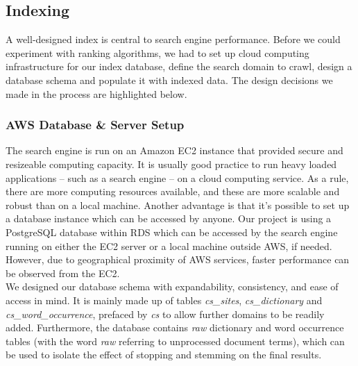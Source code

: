 
\subsection{Indexing} %
\label{sub:methods}
A well-designed index is central to search engine performance. Before we could experiment with ranking algorithms, we had to set up cloud computing infrastructure for our index database, define the search domain to crawl, design a database schema and populate it with indexed data. The design decisions we made in the process are highlighted below. %

\subsubsection{AWS Database \& Server Setup} %
\label{ssub:database_and_server_setup}

The search engine is run on an Amazon EC2 instance that provided secure and resizeable computing capacity. It is usually good practice to run heavy loaded applications -- such as a search engine -- on a cloud computing service. As a rule, there are more computing resources available, and these are more scalable and robust than on a local machine. Another advantage is that it's possible to set up a database instance which can be accessed by anyone. Our project is using a PostgreSQL database within RDS which can be accessed by the search engine running on either the EC2 server or a local machine outside AWS, if needed. However, due to geographical proximity of AWS services, faster performance can be observed from the EC2.\\

We designed our database schema with expandability, consistency, and ease of access in mind. It is mainly made up of tables \emph{cs\_sites}, \emph{cs\_dictionary} and \emph{cs\_word\_occurrence}, prefaced by \emph{cs} to allow further domains to be readily added. Furthermore, the database contains \emph{raw} dictionary and word occurrence tables (with the word \emph{raw} referring to unprocessed document terms), which can be used to isolate the effect of stopping and stemming on the final results.

